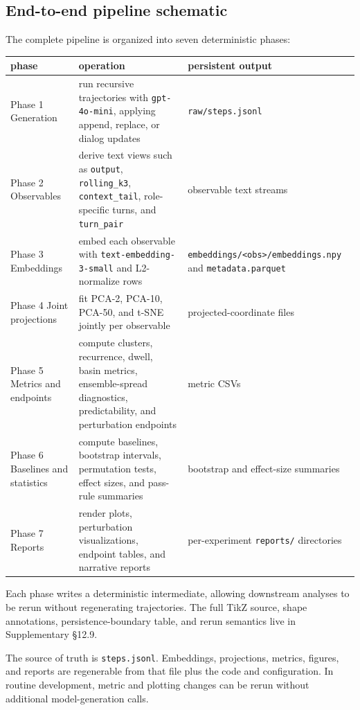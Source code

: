 \documentclass{article}
\theoremstyle{plain}
\theoremstyle{definition}
\begin{document}
\subsection{End-to-end pipeline schematic}

The complete pipeline is organized into seven deterministic phases:

\begin{table}[h!]
\centering
\small
\begin{tabularx}{\textwidth}{lYY}
\toprule
phase & operation & persistent output \\
\midrule
Phase 1 Generation & run recursive trajectories with \texttt{gpt-4o-mini}, applying append, replace, or dialog updates & \texttt{raw/steps.jsonl} \\
Phase 2 Observables & derive text views such as \texttt{output}, \texttt{rolling\_k3}, \texttt{context\_tail}, role-specific turns, and \texttt{turn\_pair} & observable text streams \\
Phase 3 Embeddings & embed each observable with \texttt{text-embedding-3-small} and L2-normalize rows & \texttt{embeddings/<obs>/embeddings.npy} and \texttt{metadata.parquet} \\
Phase 4 Joint projections & fit PCA-2, PCA-10, PCA-50, and t-SNE jointly per observable & projected-coordinate files \\
Phase 5 Metrics and endpoints & compute clusters, recurrence, dwell, basin metrics, ensemble-spread diagnostics, predictability, and perturbation endpoints & metric CSVs \\
Phase 6 Baselines and statistics & compute baselines, bootstrap intervals, permutation tests, effect sizes, and pass-rule summaries & bootstrap and effect-size summaries \\
Phase 7 Reports & render plots, perturbation visualizations, endpoint tables, and narrative reports & per-experiment \texttt{reports/} directories \\
\bottomrule
\end{tabularx}
\end{table}

Each phase writes a deterministic intermediate, allowing downstream analyses to be rerun without regenerating trajectories. The full TikZ source, shape annotations, persistence-boundary table, and rerun semantics live in Supplementary §12.9.

The source of truth is \texttt{steps.jsonl}. Embeddings, projections, metrics, figures, and reports are regenerable from that file plus the code and configuration. In routine development, metric and plotting changes can be rerun without additional model-generation calls.
\end{document}
